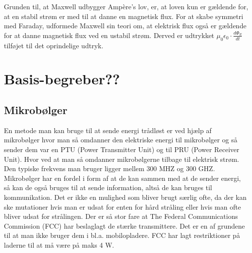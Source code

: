 Grunden til, at Maxwell udbygger Ampère's lov, er, at loven kun er gældende for, at en stabil strøm er med til at danne en magnetisk flux. For at skabe symmetri med Faraday, udformede Maxwell sin teori om, at elektrisk flux også er gældende for at danne magnetisk flux ved en ustabil strøm. Derved er udtrykket $\mu_0 \epsilon_0 \cdot \frac{d \Phi_E}{dt}$ tilføjet til det oprindelige udtryk.
\newpage
\section{Basis-begreber??}
\subsection{Mikrobølger}
En metode man kan bruge til at sende energi trådløst er ved hjælp af mikrobølger hvor man så omdanner den elektriske energi til mikrobølger og så sender dem var en PTU (Power Transmitter Unit) og til PRU (Power Receiver Unit). Hvor ved at man så omdanner mikrobølgerne tilbage til elektrisk strøm. Den typiske frekvens man bruger ligger mellem 300 MHZ og 300 GHZ. Mikrobølger har en fordel i form af at de kan sammen med at de sender energi, så kan de også bruges til at sende information, altså de kan bruges til kommunikation.  Det er ikke en mulighed som bliver brugt særlig ofte, da der kan ske mutationer hvis man er udsat for enten for hård stråling eller hvis man ofte bliver udsat for strålingen. Der er så stor fare at The Federal Communications Commission (FCC) har beslaglagt de stærke transmittere. Det er en af grundene til at man ikke bruger dem i bl.a. mobilopladere. FCC har lagt restriktioner på laderne til at må være på maks 4 W.
